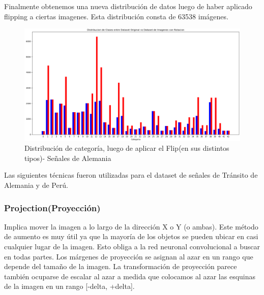 			Finalmente obtenemos una nueva distribución de datos luego de haber aplicado flipping a ciertas imagenes. Esta distribución consta de 63538 imágenes.
			\begin{figure}[H]
				\begin{center}
				\includegraphics[width=1\textwidth]{images/desarrollo/histograms/train_flipped63538}
				\end{center}
				\begin{center}
				\vspace{1em}
				\caption{\small{Distribución de categoría, luego de aplicar el Flip(en sus distintos tipos)- Señales de Alemania}}
				\vspace{-1em}
				{\small{\fontsize{10}{16.8}\selectfont {Fuente propia}}}
				\end{center}
				\vspace{-1.5em}
			\end{figure}

		Las siguientes técnicas fueron utilizadas para el dataset de señales de Tránsito de Alemania y de Perú.
		
		\subsubsection{Projection(Proyección)}
			Implica mover la imagen a lo largo de la dirección X o Y (o ambas). Este método de aumento es muy útil ya que la mayoría de los objetos se pueden ubicar en casi cualquier lugar de la imagen. Esto obliga a la red neuronal convolucional a buscar en todas partes.
			Los márgenes de proyección se asignan al azar en un rango que depende del tamaño de la imagen. La transformación de proyección parece también ocuparse de escalar al azar a medida que colocamos al azar las esquinas de la imagen en un rango [-delta, +delta].



